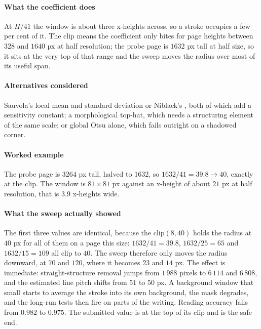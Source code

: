 \paragraph{What the coefficient does}

At $H/41$ the window is about three x-heights across, so a stroke occupies a few per cent of it. The clip means the coefficient only bites for page heights between $328$ and $1640$ px at half resolution; the probe page is $1632$ px tall at half size, so it sits at the very top of that range and the sweep moves the radius over most of its useful span.

\paragraph{Alternatives considered}

Sauvola's local mean and standard deviation \cite{sauvola2000} or Niblack's \cite{niblack1986}, both of which add a sensitivity constant; a morphological top-hat, which needs a structuring element of the same scale; or global Otsu alone, which fails outright on a shadowed corner.

\paragraph{Worked example}

The probe page is $3264$ px tall, halved to $1632$, so $1632/41 = 39.8 \to 40$, exactly at the clip. The window is $81\times81$ px against an x-height of about $21$ px at half resolution, that is $3.9$ x-heights wide.

\paragraph{What the sweep actually showed}

The first three values are identical, because the $\mathrm{clip}(8,40)$ holds the radius at $40$ px for all of them on a page this size: $1632/41 = 39.8$, $1632/25 = 65$ and $1632/15 = 109$ all clip to $40$. The sweep therefore only moves the radius downward, at $70$ and $120$, where it becomes $23$ and $14$ px. The effect is immediate: straight-structure removal jumps from $1\,988$ pixels to $6\,114$ and $6\,808$, and the estimated line pitch shifts from $51$ to $50$ px. A background window that small starts to average the stroke into its own background, the mask degrades, and the long-run tests then fire on parts of the writing. Reading accuracy falls from $0.982$ to $0.975$. The submitted value is at the top of its clip and is the safe end.


